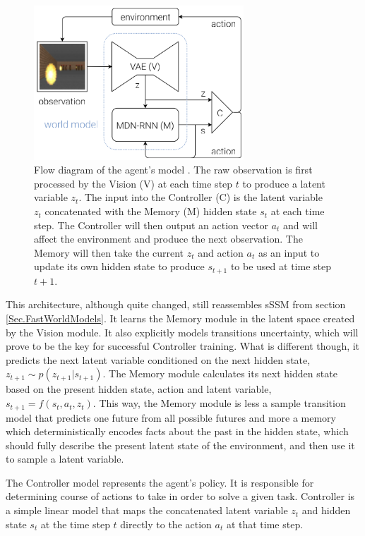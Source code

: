 \begin{figure}[H]
\includegraphics[width=0.7\textwidth,keepaspectratio]{figures/WorldModels.png}
\caption[Flow diagram of the World Models agent's model]{Flow diagram of the agent's model \protect\cite{Algo.WorldModels}. The raw observation is first processed by the Vision (V) at each time step $t$ to produce a latent variable $z_t$. The input into the Controller (C) is the latent variable $z_t$ concatenated with the Memory (M) hidden state $s_t$ at each time step. The Controller will then output an action vector $a_t$ and will affect the environment and produce the next observation. The Memory will then take the current $z_t$ and action $a_t$ as an input to update its own hidden state to produce $s_{t+1}$ to be used at time step $t + 1$.}
\label{Fig.WorldModels}
\end{figure}

This architecture, although quite changed, still reassembles sSSM from section \ref{Sec.FastWorldModels}. It learns the Memory module in the latent space created by the Vision module. It also explicitly models transitions uncertainty, which will prove to be the key for successful Controller training. What is different though, it predicts the next latent variable conditioned on the next hidden state, $z_{t+1} \sim p(z_{t+1}|s_{t+1})$. The Memory module calculates its next hidden state based on the present hidden state, action and latent variable, $s_{t+1} = f(s_t, a_t, z_t)$. This way, the Memory module is less a sample transition model that predicts one future from all possible futures and more a memory which deterministically encodes facts about the past in the hidden state, which should fully describe the present latent state of the environment, and then use it to sample a latent variable.

The Controller model represents the agent's policy. It is responsible for determining course of actions to take in order to solve a given task. Controller is a simple linear model that maps the concatenated latent variable $z_t$ and hidden state $s_t$ at the time step $t$ directly to the action $a_t$ at that time step.

